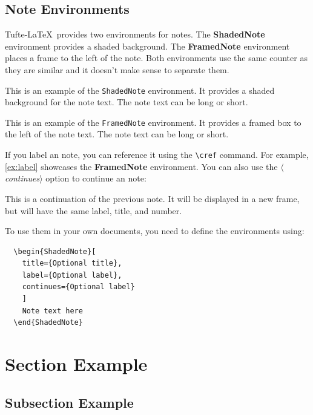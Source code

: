 \documentclass[a4paper]{tufte-handout}
\newcommand{\doccmd}[1]{\texttt{\textbackslash#1}}
\newcommand{\docopt}[1]{\ensuremath{\langle}\textrm{\textit{#1}}\ensuremath{\rangle}}
\newcommand{\docenv}[1]{\textrm{\textbf{#1}}}
\begin{document}
\subsection{Note Environments}

Tufte-\LaTeX\ provides two environments for notes. The \docenv{ShadedNote}
environment provides a shaded background. The \docenv{FramedNote} environment
places a frame to the left of the note. Both environments use the same 
counter as they are similar and it doesn't make sense to separate them.

\begin{ShadedNote}
  This is an example of the \Verb|ShadedNote| environment. It provides a
  shaded background for the note text. The note text can be long or short.
\end{ShadedNote}

\begin{FramedNote}[
  name={Note Title},
  label={ex:label}
  ]
  This is an example of the \Verb|FramedNote| environment. It provides a
  framed box to the left of the note text. The note text can be long or short.
\end{FramedNote}

If you label an note, you can reference it using the \doccmd{cref} command.
For example, \cref{ex:label} showcases the \docenv{FramedNote} environment.
You can also use the \docopt{continues} option to continue an note:

\begin{FramedNote}[continues={ex:label}]
  This is a continuation of the previous note. It will be displayed in a new
  frame, but will have the same label, title, and number.
\end{FramedNote}


To use them in your own documents, you need to define the environments using:

\begin{Verbatim}
  \begin{ShadedNote}[
    title={Optional title}, 
    label={Optional label},
    continues={Optional label}
    ]
    Note text here
  \end{ShadedNote}  
\end{Verbatim}

\section{Section Example}
\subsection{Subsection Example}
\end{document}

